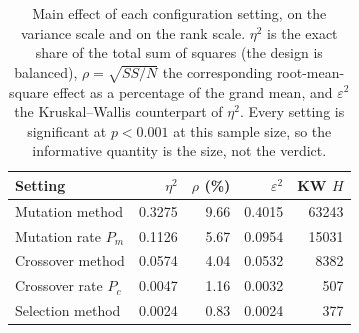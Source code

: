 \begin{table}[t]
\centering
\small
\caption{Main effect of each configuration setting, on the variance
scale and on the rank scale. $\eta^2$ is the exact share of the total
sum of squares (the design is balanced), $\rho=\sqrt{SS/N}$ the
corresponding root-mean-square effect as a percentage of the grand
mean, and $\varepsilon^2$ the Kruskal--Wallis counterpart of $\eta^2$.
Every setting is significant at $p<0.001$ at this sample size, so the
informative quantity is the size, not the verdict.}
\label{tab:factor-effects}
\begin{tabular}{lrrrr}
\toprule
Setting & $\eta^2$ & $\rho$ (\%) & $\varepsilon^2$ & KW $H$\\
\midrule
Mutation method & 0.3275 & 9.66 & 0.4015 & 63243\\
Mutation rate $P_m$ & 0.1126 & 5.67 & 0.0954 & 15031\\
Crossover method & 0.0574 & 4.04 & 0.0532 & 8382\\
Crossover rate $P_c$ & 0.0047 & 1.16 & 0.0032 & 507\\
Selection method & 0.0024 & 0.83 & 0.0024 & 377\\
\bottomrule
\end{tabular}
\end{table}
